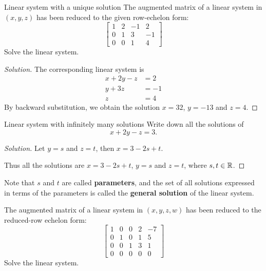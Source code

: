 \begin{exmp}{Linear system with a unique solution}{} 
The augmented matrix of a linear system in $(x,y,z)$ has been reduced to the given row-echelon form:
\[ \begin{bmatrix}
    1 & 2 & -1 & 2 \\
    0 & 1 & 3 & -1 \\
    0 & 0 & 1 & 4
\end{bmatrix} \]
Solve the linear system.
\end{exmp}

\begin{proof}[Solution]
The corresponding linear system is
\begin{align*}
x + 2y - z &= 2 \\
y + 3z &= -1 \\
z &= 4
\end{align*}
By backward substitution, we obtain the solution $x=32$, $y=-13$ and $z=4$.
\end{proof}

\begin{exmp}{Linear system with infinitely many solutions}{}
Write down all the solutions of 
\[ x+2y-z=3. \]
\end{exmp}

\begin{proof}[Solution]
Let $y=s$ and $z=t$, then $x=3-2s+t$.

Thus all the solutions are $x=3-2s+t$, $y=s$ and $z=t$, where $s,t\in\mathbb R$.
\end{proof}

\begin{remark}
Note that $s$ and $t$ are called \textbf{parameters}, and the set of all solutions expressed in terms of the parameters is called the \textbf{general solution} of the linear system.
\end{remark}

\begin{exmp}{}{}
The augmented matrix of a linear system in $(x,y,z,w)$ has been reduced to the reduced-row echelon form:
\[ \begin{bmatrix}
    1 & 0 & 0 & 2 & -7 \\
    0 & 1 & 0 & 1 & 5 \\
    0 & 0 & 1 & 3 & 1 \\
    0 & 0 & 0 & 0 & 0
\end{bmatrix} \]
Solve the linear system.
\end{exmp}


